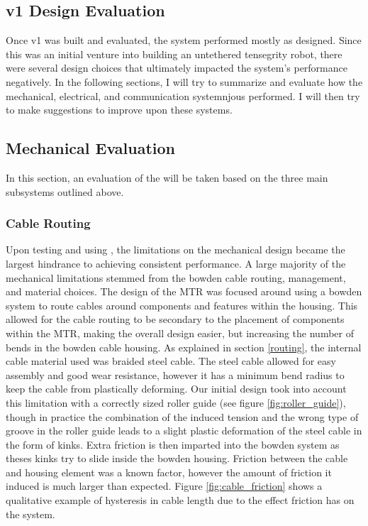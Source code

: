 \begin{appendices}
\chapter{\SB{} v1 Design Evaluation}
\label{app:evalutation}

Once \SB{} v1 was built and evaluated, the system performed mostly as designed.
Since this was an initial venture into building an untethered tensegrity robot, there were several design choices that ultimately impacted the system's performance negatively.
In the following sections, I will try to summarize and evaluate how the mechanical, electrical, and communication systemnjous performed.
I will then try to make suggestions to improve upon these systems.

\section{Mechanical Evaluation}

In this section, an evaluation of the \SB{} will be taken based on the three main subsystems outlined above.

\subsection{Cable Routing}
Upon testing and using \SB{}, the limitations on the mechanical design became the largest hindrance to achieving consistent performance.
A large majority of the mechanical limitations stemmed from the bowden cable routing, management, and material choices.
The design of the MTR was focused around using a bowden system to route cables around components and features within the housing.
This allowed for the cable routing to be secondary to the placement of components within the MTR, making the overall design easier, but increasing the number of bends in the bowden cable housing.
As explained in section \ref{routing}, the internal cable material used was braided steel cable.
The steel cable allowed for easy assembly and good wear resistance, however it has a minimum bend radius to keep the cable from plastically deforming.
Our initial design took into account this limitation with a correctly sized roller guide (see figure \ref{fig:roller_guide}), though in practice the combination of the induced tension and the wrong type of groove in the roller guide leads to a slight plastic deformation of the steel cable in the form of kinks.
Extra friction is then imparted into the bowden system as theses kinks try to slide inside the bowden housing.
Friction between the cable and housing element was a known factor, however the amount of friction it induced is much larger than expected.
Figure \ref{fig:cable_friction} shows a qualitative example of hysteresis in cable length due to the effect friction has on the system.


\end{appendices}
